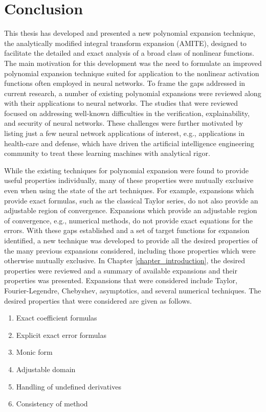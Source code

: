 \chapter{Conclusion}

\label{chapter_conclusion}

This thesis has developed and presented a new polynomial expansion technique, the analytically modified integral transform expansion (AMITE), designed to facilitate the detailed and exact analysis of a broad class of nonlinear functions.  The main motivation for this development was the need to formulate an improved polynomial expansion technique suited for application to the nonlinear activation functions often employed in neural networks.  To frame the gaps addressed in current research, a number of existing polynomial expansions were reviewed along with their applications to neural networks.  The studies that were reviewed focused on
addressing well-known difficulties in the verification, explainability, and
security of neural networks.  These challenges were further
motivated by listing just a few neural network applications of interest,
e.g., applications in health-care and defense, which have driven
the artificial intelligence
engineering community to treat these learning machines with analytical rigor.

While the existing techniques for polynomial expansion were found to provide useful properties individually, many of these properties were mutually exclusive even when using the state of the art techniques.  For example, expansions which provide exact formulas, such as the classical Taylor series, do not also provide an adjustable region of convergence.  Expansions which provide an adjustable region of convergence, e.g., numerical methods, do not provide exact equations for the errors.  With these gaps established and a set of target functions for expansion identified, a new technique was developed to provide all the desired properties of the many previous expansions considered, including those properties which were otherwise mutually exclusive.  In Chapter \ref{chapter_introduction}, the desired properties were reviewed and a summary of available expansions and their properties was presented.   Expansions that were considered include Taylor, Fourier-Legendre, Chebyshev, asymptotics, and several numerical techniques. The desired properties that were considered are given as follows.
\begin{enumerate}
	\itemsep-0.5em 
	\item Exact coefficient formulas
	\item Explicit exact error formulas
	\item Monic form
	\item Adjustable domain
	\item Handling of undefined derivatives
	\item Consistency of method
\end{enumerate}

